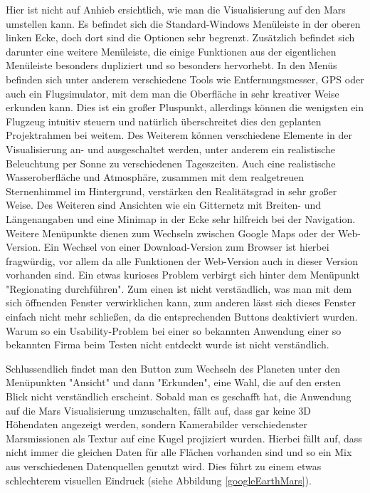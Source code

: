 Hier ist nicht auf Anhieb ersichtlich, wie man die Visualisierung auf den Mars umstellen kann. Es befindet sich die Standard-Windows Menüleiste in der oberen linken Ecke, doch dort sind die Optionen sehr begrenzt. Zusätzlich befindet sich darunter eine weitere Menüleiste, die einige Funktionen aus der eigentlichen Menüleiste besonders dupliziert und so besonders hervorhebt. In den Menüs befinden sich unter anderem verschiedene Tools wie Entfernungsmesser, GPS oder auch ein Flugsimulator, mit dem man die Oberfläche in sehr kreativer Weise erkunden kann. Dies ist ein großer Pluspunkt, allerdings können die wenigsten ein Flugzeug intuitiv steuern und natürlich überschreitet dies den geplanten Projektrahmen bei weitem. Des Weiterem können verschiedene Elemente in der Visualisierung an- und ausgeschaltet werden, unter anderem ein realistische Beleuchtung per Sonne zu verschiedenen Tageszeiten. Auch eine realistische Wasseroberfläche und Atmosphäre, zusammen mit dem realgetreuen Sternenhimmel im Hintergrund, verstärken den Realitätsgrad in sehr großer Weise. Des Weiteren sind Ansichten wie ein Gitternetz mit Breiten- und Längenangaben und eine Minimap in der Ecke sehr hilfreich bei der Navigation. Weitere Menüpunkte dienen zum Wechseln zwischen Google Maps oder der Web-Version. Ein Wechsel von einer Download-Version zum Browser ist hierbei fragwürdig, vor allem da alle Funktionen der Web-Version auch in dieser Version vorhanden sind. Ein etwas kurioses Problem verbirgt sich hinter dem Menüpunkt "Regionating durchführen". Zum einen ist nicht verständlich, was man mit dem sich öffnenden Fenster verwirklichen kann, zum anderen lässt sich dieses Fenster einfach nicht mehr schließen, da die entsprechenden Buttons deaktiviert wurden. Warum so ein Usability-Problem bei einer so bekannten Anwendung einer so bekannten Firma beim Testen nicht entdeckt wurde ist nicht verständlich.

Schlussendlich findet man den Button zum Wechseln des Planeten unter den Menüpunkten "Ansicht" und dann "Erkunden", eine Wahl, die auf den ersten Blick nicht verständlich erscheint. Sobald man es geschafft hat, die Anwendung auf die Mars Visualisierung umzuschalten, fällt auf, dass gar keine 3D Höhendaten angezeigt werden, sondern Kamerabilder verschiedenster Marsmissionen als Textur auf eine Kugel projiziert wurden. Hierbei fällt auf, dass nicht immer die gleichen Daten für alle Flächen vorhanden sind und so ein Mix aus verschiedenen Datenquellen genutzt wird. Dies führt zu einem etwas schlechterem visuellen Eindruck (siehe Abbildung \ref{googleEarthMars}).

